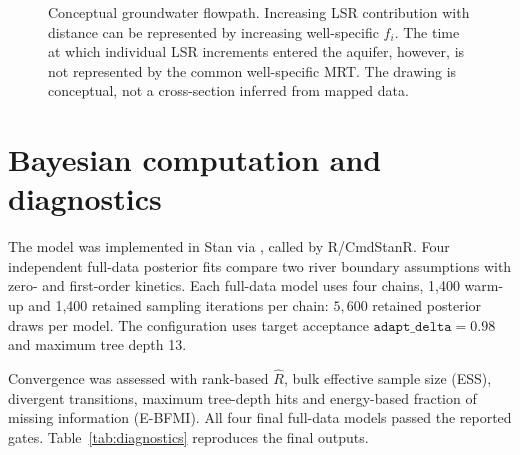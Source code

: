\documentclass[11pt,a4paper]{article}
\begin{document}
\begin{figure}[htbp]
\centering
{}
\caption{Conceptual groundwater flowpath. Increasing LSR contribution with distance can be represented by increasing well-specific \(f_i\). The time at which individual LSR increments entered the aquifer, however, is not represented by the common well-specific MRT. The drawing is conceptual, not a cross-section inferred from mapped data.}
\label{fig:flowpath}
\end{figure}

\section{Bayesian computation and diagnostics}
The model was implemented in Stan via , called by R/CmdStanR. Four independent full-data posterior fits compare two river boundary assumptions with zero- and first-order kinetics. Each full-data model uses four chains, 1,400 warm-up and 1,400 retained sampling iterations per chain: \(5{,}600\) retained posterior draws per model. The configuration uses target acceptance \(\texttt{adapt\_delta}=0.98\) and maximum tree depth 13.

Convergence was assessed with rank-based \(\widehat R\), bulk effective sample size (ESS), divergent transitions, maximum tree-depth hits and energy-based fraction of missing information (E-BFMI). All four final full-data models passed the reported gates. Table~\ref{tab:diagnostics} reproduces the final outputs.
\end{document}
